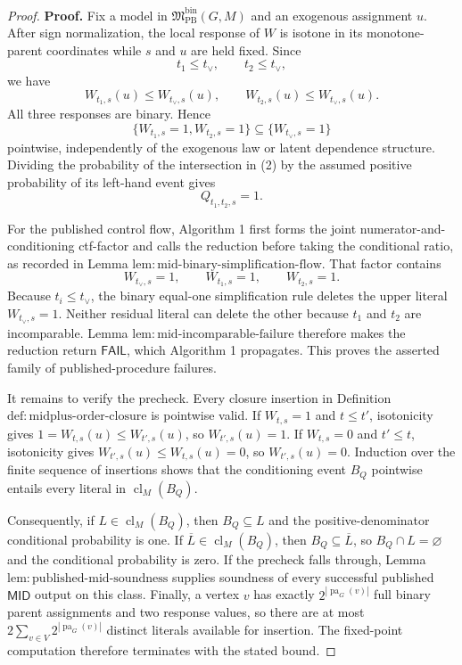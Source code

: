 \documentclass{article}
\begin{document}
\begin{proof}
\textbf{Proof.}
Fix a model in \(\mathfrak M_{\mathrm{PB}}^{\mathrm{bin}}(G,M)\) and an exogenous assignment \(u\).  After sign normalization, the local response of \(W\) is isotone in its monotone-parent coordinates while \(s\) and \(u\) are held fixed.  Since
\[
 t_1\le t_{\vee},
 \qquad
 t_2\le t_{\vee},
\]
we have
\[
 W_{t_1,s}(u)\le W_{t_{\vee},s}(u),
 \qquad
 W_{t_2,s}(u)\le W_{t_{\vee},s}(u).
\tag{1}
\]
All three responses are binary.  Hence
\[
 \{W_{t_1,s}=1,W_{t_2,s}=1\}
 \subseteq
 \{W_{t_{\vee},s}=1\}
\tag{2}
\]
pointwise, independently of the exogenous law or latent dependence structure.  Dividing the probability of the intersection in (2) by the assumed positive probability of its left-hand event gives
\[
 Q_{t_1,t_2,s}=1.
\tag{3}
\]

For the published control flow, Algorithm 1 first forms the joint numerator-and-conditioning ctf-factor and calls the reduction before taking the conditional ratio, as recorded in Lemma \(\mathrm{lem:mid\text{-}binary\text{-}simplification\text{-}flow}\).  That factor contains
\[
 W_{t_{\vee},s}=1,
 \qquad
 W_{t_1,s}=1,
 \qquad
 W_{t_2,s}=1.
\tag{4}
\]
Because \(t_i\le t_{\vee}\), the binary equal-one simplification rule deletes the upper literal \(W_{t_{\vee},s}=1\).  Neither residual literal can delete the other because \(t_1\) and \(t_2\) are incomparable.  Lemma \(\mathrm{lem:mid\text{-}incomparable\text{-}failure}\) therefore makes the reduction return \(\mathsf{FAIL}\), which Algorithm 1 propagates.  This proves the asserted family of published-procedure failures.

It remains to verify the precheck.  Every closure insertion in Definition \(\mathrm{def:midplus\text{-}order\text{-}closure}\) is pointwise valid.  If \(W_{t,s}=1\) and \(t\le t'\), isotonicity gives \(1=W_{t,s}(u)\le W_{t',s}(u)\), so \(W_{t',s}(u)=1\).  If \(W_{t,s}=0\) and \(t'\le t\), isotonicity gives \(W_{t',s}(u)\le W_{t,s}(u)=0\), so \(W_{t',s}(u)=0\).  Induction over the finite sequence of insertions shows that the conditioning event \(B_Q\) pointwise entails every literal in \(\operatorname{cl}_M(B_Q)\).

Consequently, if \(L\in\operatorname{cl}_M(B_Q)\), then \(B_Q\subseteq L\) and the positive-denominator conditional probability is one.  If \(\overline L\in\operatorname{cl}_M(B_Q)\), then \(B_Q\subseteq\overline L\), so \(B_Q\cap L=\varnothing\) and the conditional probability is zero.  If the precheck falls through, Lemma \(\mathrm{lem:published\text{-}mid\text{-}soundness}\) supplies soundness of every successful published \(\mathsf{MID}\) output on this class.  Finally, a vertex \(v\) has exactly \(2^{|\operatorname{pa}_G(v)|}\) full binary parent assignments and two response values, so there are at most \(2\sum_{v\in V}2^{|\operatorname{pa}_G(v)|}\) distinct literals available for insertion.  The fixed-point computation therefore terminates with the stated bound.


\end{proof}
\end{document}
